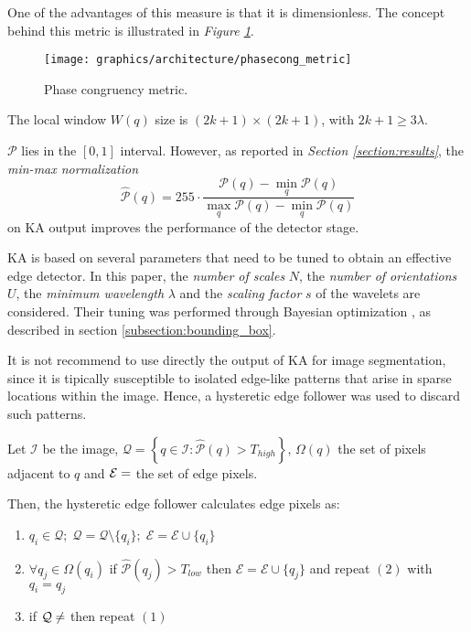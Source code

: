         \par{
            One of the advantages of this measure is that it is dimensionless. The concept behind this metric is illustrated in \emph{Figure \ref{fig:phase-congruency-metric}}.
        }
	    \begin{figure}
	    	\centering
	    	\texttt{[image: graphics/architecture/phasecong\_metric]}
	    	\caption{Phase congruency metric.}
	    	\label{fig:phase-congruency-metric}
	    \end{figure}
	    \par{
	    	The local window $W(q)$ size is $(2k+1)\times(2k+1)$, with $2k+1 \geq 3\lambda$.
		}
        \par{
        	$\mathcal{P}$ lies in the $[0,1]$ interval. However, as reported in \emph{Section \ref{section:results}}, the \emph{min-max normalization}
        	\begin{equation*}
        	\hat{\mathcal{P}}(q) = 255 \cdot \frac{\mathcal{P}(q)-\min_q\mathcal{P}(q)}{\max_q\mathcal{P}(q)-\min_q\mathcal{P}(q)}
        	\end{equation*}
        	 on KA output improves the performance of the detector stage.
        }
        \par{
        	KA is based on several parameters that need to be tuned to obtain an effective edge detector. In this paper, the \emph{number of scales} $N$, the \emph{number of orientations} $U$, the \emph{minimum wavelength} $\lambda$ and the \emph{scaling factor} $s$ of the wavelets are considered. Their tuning was performed through Bayesian optimization \cite{arXiv:2012arXiv1206.2944S,arXiv:2018arXiv180702811F, matlab:bayesian-opt}, as described in section \ref{subsection:bounding_box}.
        }
        \par{
            It is not recommend to use directly the output of KA for image segmentation, since it is tipically susceptible to isolated edge-like patterns that arise in sparse locations within the image. Hence, a hysteretic edge follower was used to discard such patterns.
        }
        \par{
            Let $\mathcal{I}$ be the image, $\mathcal{Q} = \left\{q \in \mathcal{I} \colon \hat{\mathcal{P}}(q) > T_{high}\right\}$, $\Omega(q)$ the set of  pixels adjacent to $q$ and $\mathcal{E} = \empty$ the set of edge pixels.
        }
        \par{
            Then, the hysteretic edge follower calculates edge pixels as:
            \begin{enumerate}
    			\item $q_i \in \mathcal{Q};\; \mathcal{Q} = \mathcal{Q} \setminus \{q_i\};\;\mathcal{E} = \mathcal{E} \cup \{q_i\}$
    			\item $\forall q_j \in \Omega(q_i)$ if $\hat{\mathcal{P}}(q_j) > T_{low}$ then $\mathcal{E} = \mathcal{E} \cup \{q_j\}$ and repeat $(2)$ with $q_i = q_j$
    			\item if $\mathcal{Q} \neq \empty$ then repeat $(1)$
    		\end{enumerate}
        }
